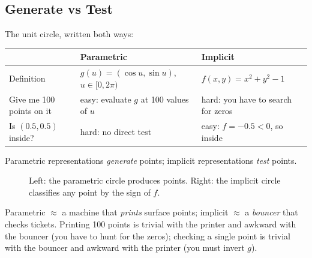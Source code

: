 \documentclass[11pt,a4paper]{article}
\theoremstyle{definition}
\theoremstyle{plain}
\theoremstyle{remark}
\begin{document}
\subsection{Generate vs Test }
The unit circle, written both ways:
\begin{center}
\begin{tabular}{L{3.2cm}L{5.4cm}L{5.4cm}}
\toprule
 & \textbf{Parametric} & \textbf{Implicit}\\
\midrule
Definition & $g(u)=(\cos u,\sin u)$, $u\in[0,2\pi)$ & $f(x,y)=x^2+y^2-1$\\
Give me 100 points on it & easy: evaluate $g$ at 100 values of $u$ & hard: you have to search for zeros\\
Is $(0.5,0.5)$ inside? & hard: no direct test & easy: $f=-0.5<0$, so inside\\
\bottomrule
\end{tabular}
\end{center}
Parametric representations \emph{generate} points; implicit representations \emph{test} points.

\begin{figure}[ht]
\centering
{}
\caption{Left: the parametric circle produces points. Right: the implicit circle classifies any point by the sign of $f$.}
\end{figure}

\begin{intuition}
Parametric $\approx$ a machine that \emph{prints} surface points; implicit $\approx$ a \emph{bouncer} that checks tickets. Printing 100 points is trivial with the printer and awkward with the bouncer (you have to hunt for the zeros); checking a single point is trivial with the bouncer and awkward with the printer (you must invert $g$).
\end{intuition}
\end{document}
